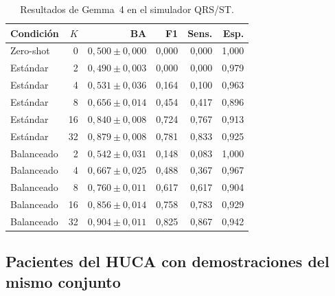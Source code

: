 \begin{table}[H]
  \centering
  \small
  \begin{tabular}{lrrrrr}
    \toprule
    Condición & \(K\) & BA & F1 & Sens. & Esp. \\
    \midrule
    Zero-shot & 0 & \(0,500 \pm 0,000\) & 0,000 & 0,000 & 1,000 \\
    Estándar & 2 & \(0,490 \pm 0,003\) & 0,000 & 0,000 & 0,979 \\
    Estándar & 4 & \(0,531 \pm 0,036\) & 0,164 & 0,100 & 0,963 \\
    Estándar & 8 & \(0,656 \pm 0,014\) & 0,454 & 0,417 & 0,896 \\
    Estándar & 16 & \(0,840 \pm 0,008\) & 0,724 & 0,767 & 0,913 \\
    Estándar & 32 & \(0,879 \pm 0,008\) & 0,781 & 0,833 & 0,925 \\
    Balanceado & 2 & \(0,542 \pm 0,031\) & 0,148 & 0,083 & 1,000 \\
    Balanceado & 4 & \(0,667 \pm 0,025\) & 0,488 & 0,367 & 0,967 \\
    Balanceado & 8 & \(0,760 \pm 0,011\) & 0,617 & 0,617 & 0,904 \\
    Balanceado & 16 & \(0,856 \pm 0,014\) & 0,758 & 0,783 & 0,929 \\
    Balanceado & 32 & \(0,904 \pm 0,011\) & 0,825 & 0,867 & 0,942 \\
    \bottomrule
  \end{tabular}
  \caption{Resultados de Gemma~4 en el simulador QRS/ST.}
  \label{tab:app_vlm_simulador}
  \resultstablenote
\end{table}

\clearpage
\subsection{Pacientes del HUCA con demostraciones del mismo conjunto}

